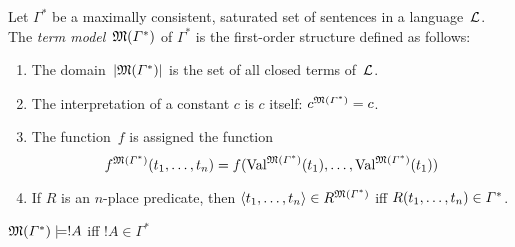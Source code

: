 \documentclass[open-logic-section]{subfiles}
\begin{document}

\begin{defn}
Let $\Gamma^*$ be a maximally consistent, saturated set of sentences
in a language~$\mathcal L$.  The \emph{term model}~$\mathfrak M(\Gamma^*)$
of $\Gamma^*$ is the first-order structure defined as follows:
\begin{enumerate}
\item The domain~$\left| \mathfrak M(\Gamma^*) \right|$ is the set of all closed terms
  of~$\mathcal L$.
\item The interpretation of a constant $c$ is $c$ itself:
  $c^{\mathfrak M(\Gamma^*)} = c$.
\item The function~$f$ is assigned the function
\[
\Assign{f}{M(\Gamma^*)}(t_1, \dots, t_n) = f(\Value{t_1}{M(\Gamma^*)},
\dots, \Value{t_1}{M(\Gamma^*)})
\]
\item If $R$ is an $n$-place predicate, then $\langle t_1, \dots,
  t_n\rangle \in R^{\mathfrak M(\Gamma^*)}$ iff ${ R(t_1, \dots,
    t_n) } \in \Gamma^*$.
\end{enumerate}
\end{defn}

\begin{lem}
$\Sat{M(\Gamma^*)}{!A}$ iff $!A \in \Gamma^*$
\end{lem}

\end{document}
